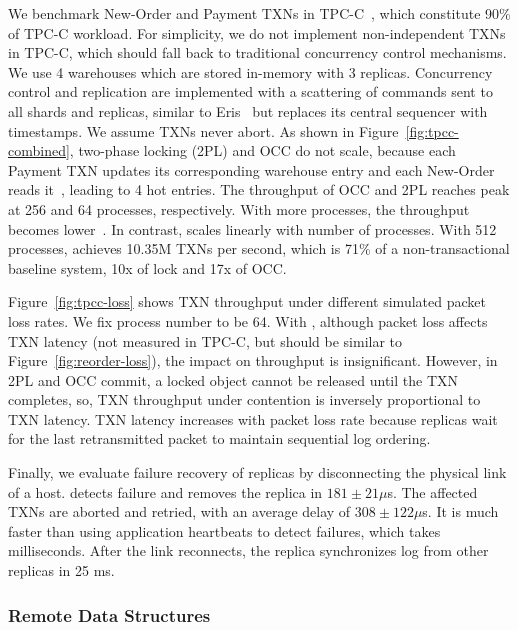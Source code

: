 We benchmark New-Order and Payment TXNs in TPC-C~\cite{tpcc}, which constitute 90\% of TPC-C workload.
For simplicity, we do not implement non-independent TXNs in TPC-C, which should fall back to traditional concurrency control mechanisms.
We use 4 warehouses which are stored in-memory with 3 replicas.
Concurrency control and replication are implemented with a scattering of commands sent to all shards and replicas, similar to Eris~\cite{eris} but replaces its central sequencer with timestamps.
We assume TXNs never abort.
As shown in Figure~\ref{fig:tpcc-combined}, two-phase locking (2PL) and OCC do not scale, because each Payment TXN updates its corresponding warehouse entry and each New-Order reads it~\cite{yu2014staring}, leading to 4 hot entries.
The throughput of OCC and 2PL reaches peak at 256 and 64 processes, respectively. With more processes, the throughput becomes lower~\cite{mu2014extracting}.
In contrast, \sys{} scales linearly with number of processes. With 512 processes, \sys achieves 10.35M TXNs per second, which is 71\% of a non-transactional baseline system, 10x of lock and 17x of OCC. %

Figure~\ref{fig:tpcc-loss} shows TXN throughput under different simulated packet loss rates.
We fix process number to be 64.
With \sys{}, although packet loss affects TXN latency (not measured in TPC-C, but should be similar to Figure~\ref{fig:reorder-loss}), the impact on throughput is insignificant. %
However, in 2PL and OCC commit, a locked object cannot be released until the TXN completes, so, TXN throughput under contention is inversely proportional to TXN latency.
TXN latency increases with packet loss rate because replicas wait for the last retransmitted packet to maintain sequential log ordering.

Finally, we evaluate failure recovery of replicas by disconnecting the physical link of a host. \sys{} detects failure and removes the replica in $181 \pm 21 \mu$s. The affected TXNs are aborted and retried, with an average delay of $308 \pm 122 \mu$s. It is much faster than using application heartbeats to detect failures, which takes milliseconds. After the link reconnects, the replica synchronizes log from other replicas in 25 ms.

\subsubsection{Remote Data Structures}
\label{subsec:data-structure}

